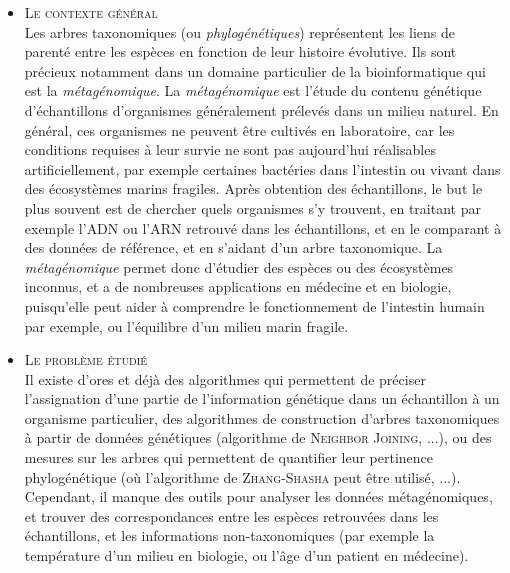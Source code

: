 \documentclass{report}
\begin{document}
\begin{itemize}
\item \textsc{Le contexte général}\\

Les arbres taxonomiques (ou \emph{phylogénétiques}) représentent les liens de parenté entre les espèces en fonction de leur histoire évolutive. Ils sont précieux notamment dans un domaine particulier de la bioinformatique qui est la \emph{métagénomique}. La \emph{métagénomique} est l'étude du contenu génétique d'échantillons d'organismes généralement prélevés dans un milieu naturel. En général, ces organismes ne peuvent être cultivés en laboratoire, car les conditions requises à leur survie ne sont pas aujourd'hui réalisables artificiellement, par exemple certaines bactéries dans l'intestin ou vivant dans des écosystèmes marins fragiles. Après obtention des échantillons, le but le plus souvent est de chercher quels organismes s'y trouvent, en traitant par exemple l'\textsc{ADN} ou l'\textsc{ARN} retrouvé dans les échantillons, et en le comparant à des données de référence, et en s'aidant d'un arbre taxonomique. La \emph{métagénomique} permet donc d'étudier des espèces ou des écosystèmes inconnus, et a de nombreuses applications en médecine et en biologie, puisqu'elle peut aider à comprendre le fonctionnement de l'intestin humain par exemple, ou l'équilibre d'un milieu marin fragile.

\item \textsc{Le problème étudié}\\

Il existe d'ores et déjà des algorithmes qui permettent de préciser l'assigna\-tion d'une partie de l'information génétique dans un échantillon à un organisme particulier, des algorithmes de construction d'arbres taxonomiques à partir de données génétiques (algorithme de \textsc{Neighbor Joining}, ...), ou des mesures sur les arbres qui permettent de quantifier leur pertinence phylogénétique (où l'algorithme de \textsc{Zhang-Shasha} peut être utilisé, ...). Cependant, il manque des outils pour analyser les données métagénomiques, et trouver des correspondances entre les espèces retrouvées dans les échantillons, et les informations non-taxonomiques (par exemple la température d'un milieu en biologie, ou l'âge d'un patient en médecine).\\


\end{itemize}
\end{document}
